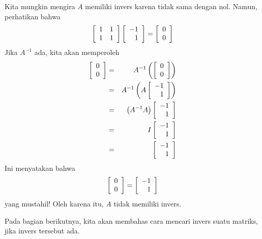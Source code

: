 \begin{solution} Kita mungkin mengira $A$ memiliki invers karena tidak sama dengan nol.
Namun, perhatikan bahwa
\begin{equation*}
\left[
\begin{array}{rr}
1 & 1 \\
1 & 1
\end{array}
\right] \left[
\begin{array}{r}
-1 \\
1
\end{array}
\right] =\left[
\begin{array}{r}
0 \\
0
\end{array}
\right]
\end{equation*}
Jika $A^{-1}$ ada, kita akan memperoleh
\begin{eqnarray*}
\left[
\begin{array}{r}
0 \\
0
\end{array}
\right] &=& A^{-1}\left( \left[
\begin{array}{r}
0 \\
0
\end{array}
\right] \right) \\
&=& A^{-1}\left( A\left[
\begin{array}{r}
-1 \\
1
\end{array}
\right] \right) \\
&=&\left( A^{-1}A\right) \left[
\begin{array}{r}
-1 \\
1
\end{array}
\right] \\
&=&I\left[
\begin{array}{r}
-1 \\
1
\end{array}
\right] \\
&=&\left[
\begin{array}{r}
-1 \\
1
\end{array}
\right]
\end{eqnarray*}
Ini menyatakan bahwa
\begin{equation*}
\left[
\begin{array}{r}
0 \\
0
\end{array}
\right]
=
\left[
\begin{array}{r}
-1 \\
1
\end{array}
\right]
\end{equation*}
yang mustahil! Oleh karena itu, $A$ tidak memiliki invers. 
\end{solution}

Pada bagian berikutnya, kita akan membahas cara mencari invers suatu matriks, jika invers tersebut ada. 
